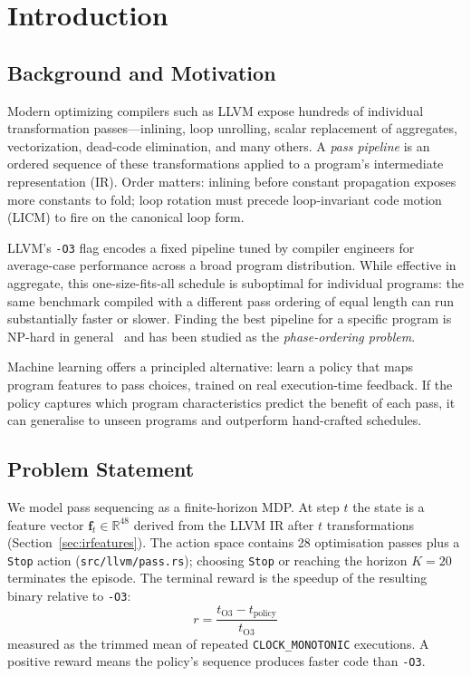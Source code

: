 \documentclass[conference]{IEEEtran}
\newcommand{\opt}[1]{\texttt{-O#1}}
\newcommand{\pass}[1]{\texttt{#1}}
\begin{document}
\section{Introduction}

\subsection{Background and Motivation}
Modern optimizing compilers such as LLVM expose hundreds of individual
transformation passes---inlining, loop unrolling, scalar replacement of
aggregates, vectorization, dead-code elimination, and many others.
A \emph{pass pipeline} is an ordered sequence of these transformations
applied to a program's intermediate representation (IR).
Order matters: inlining before constant propagation exposes more constants
to fold; loop rotation must precede loop-invariant code motion (LICM) to
fire on the canonical loop form.

LLVM's \opt{3} flag encodes a fixed pipeline tuned by compiler engineers
for average-case performance across a broad program distribution.
While effective in aggregate, this one-size-fits-all schedule is suboptimal
for individual programs: the same benchmark compiled with a different pass
ordering of equal length can run substantially faster or slower.
Finding the best pipeline for a specific program is NP-hard in
general~\cite{almagor2004finding} and has been studied as the
\emph{phase-ordering problem}.

Machine learning offers a principled alternative: learn a policy that maps
program features to pass choices, trained on real execution-time feedback.
If the policy captures which program characteristics predict the benefit of
each pass, it can generalise to unseen programs and outperform hand-crafted
schedules.

\subsection{Problem Statement}
We model pass sequencing as a finite-horizon MDP.
At step $t$ the state is a feature vector $\mathbf{f}_t \in \mathbb{R}^{48}$
derived from the LLVM IR after $t$ transformations (Section~\ref{sec:irfeatures}).
The action space contains 28 optimisation passes plus a \pass{Stop} action
(\texttt{src/llvm/pass.rs}); choosing \pass{Stop} or reaching the horizon
$K = 20$ terminates the episode.
The terminal reward is the speedup of the resulting binary relative to \opt{3}:
%
\begin{equation}
r = \frac{t_{\text{O3}} - t_{\text{policy}}}{t_{\text{O3}}}
\label{eq:speedup}
\end{equation}
%
measured as the trimmed mean of repeated \texttt{CLOCK\_MONOTONIC} executions.
A positive reward means the policy's sequence produces faster code than \opt{3}.
\end{document}
